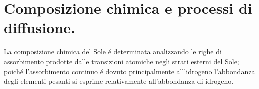 \documentclass[../main.tex]{subfiles}
\begin{document}
\begin{comment}
\begingroup
\color{grey}
La composizione chimica \'e modificata dalle reazioni di fusione che per gli elementi principali, assumendo condizione di equilibrio secolare, riassumo
\begin{subequations}\label{subeqn:fusionchange}
\begin{align}
&\dot{X}=\frac{m_p}{N_A}(-3r_{pp}+2r_{33}-r_{34}-4r_{p14})\\ 
&\dot{Y}_3=\frac{m_{He3}}{N_A}(r_{pp}-2r_{33}-r_{34})\\
&\dot{Y}=\frac{m_{He4}}{N_A}(r_{33}+r_{34}+r_{p14})
\end{align}
\end{subequations}

con $r_{ik}$ rate di reazione per unit\'a di massa:

\begin{align}
&r_{ik}=\frac{\rho N_A^2X_iX_k}{(1+\delta_{ik})A_iA_k}\lambda_{ik}\shortintertext{dove, introducendo il fattore astrofisico $S(E)$, la massa ridotta dei due reagenti $m_{ik}$}\nonumber\\
&\lambda_{ik}=\sqrt{\frac{8}{m_{ik}\pi}}\frac{S_{ik}|_{E=0}}{(kT)\expy{\frac{3}{2}}}\intzi{}\exp{(-\frac{E}{kT}-\frac{b}{\sqrt{E}})}\,dE,\ b=31.28Z_1Z_2\sqrt{\frac{m_{ik}}{m_u}}\,(KeV)\expy{-1}\label{eq:astrofactor}
\end{align}

\endgroup

\end{comment}

\section{Composizione chimica e processi di diffusione.}

La composizione chimica del Sole \'e determinata analizzando le righe di assorbimento prodotte dalle transizioni atomiche negli strati esterni del Sole; poich\'e l'assorbimento continuo \'e dovuto principalmente all'idrogeno l'abbondanza degli elementi pesanti si esprime relativamente all'abbondanza di idrogeno.

\end{document}
